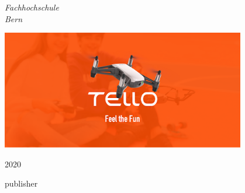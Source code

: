 \begin{titlepage}
	\vspace{0.5\baselineskip} %

	\textit{Fachhochschule \\ Bern} %

	\vfill %


	\begin{center}
	\includegraphics[width=0.8\textwidth]{../common/resources/01_front_image.png}
	\end{center}

	\vspace{0.3\baselineskip} %

	2020 %

	{\large publisher} %

\end{titlepage}
